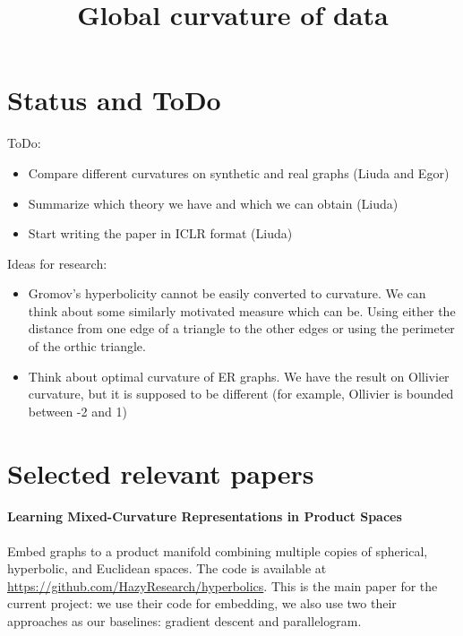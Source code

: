 \documentclass{article}
\title{Global curvature of data}
\author{}
\date{}
\begin{document}
\maketitle

\section{Status and ToDo}

ToDo:
\begin{itemize}
    \item Compare different curvatures on synthetic and real graphs (Liuda and Egor)
    \item Summarize which theory we have and which we can obtain (Liuda)
    \item Start writing the paper in ICLR format (Liuda)
\end{itemize}

Ideas for research:
\begin{itemize}
    \item Gromov's hyperbolicity cannot be easily converted to curvature. We can think about some similarly motivated measure which can be. Using either the distance from one edge of a triangle to the other edges or using the perimeter of the orthic triangle. 
    \item Think about optimal curvature of ER graphs. We have the result on  Ollivier curvature, but it is supposed to be different (for example, Ollivier is bounded between -2 and 1)
\end{itemize}

\section{Selected relevant papers}

\paragraph{Learning Mixed-Curvature Representations in Product Spaces~\cite{gu2019learning}}

Embed graphs to a product manifold combining multiple copies of spherical,
hyperbolic, and Euclidean spaces. The code is available at \url{https://github.com/HazyResearch/hyperbolics}. 
This is the main paper for the current project: we use their code for embedding, we also use two their approaches as our baselines: gradient descent and parallelogram. 
\end{document}
